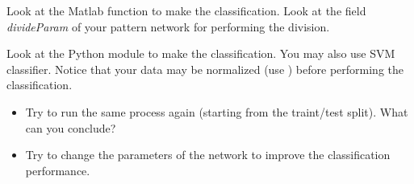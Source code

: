 \begin{mcomment}
\begin{mremark}
Look at the Matlab function  to make the classification.  Look at the field \textsl{divideParam} of your pattern network for performing the division.
\end{mremark}
\end{mcomment}

\begin{pcomment}
\begin{premark}
Look at the Python module  to make the classification. You may also use SVM classifier. Notice that your data may be normalized (use ) before performing the classification.
\end{premark}
\end{pcomment}


\begin{qbox}
\begin{itemize}
 	\item Try to run the same process again (starting from the traint/test split). What can you conclude?
	\item Try to change the parameters of the network to improve the classification performance.
\end{itemize}
\end{qbox}

